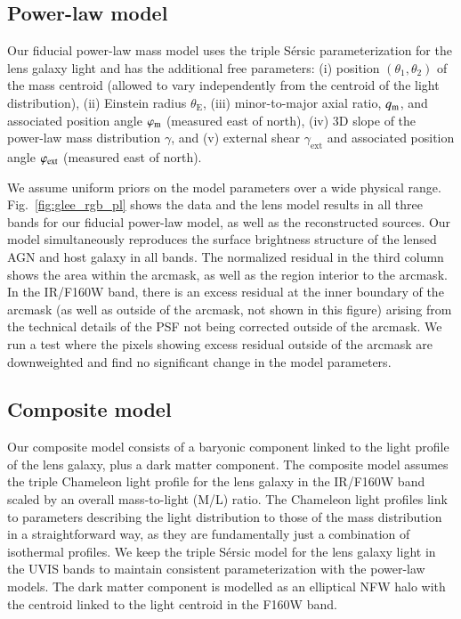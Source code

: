 \documentclass[longauth]{aa}
\newcommand{\ajsiii}[1]{{{#1}}}
\newcommand{\suyu}[1]{{{#1}}}
\newcommand{\lreply}[1]{{{#1}}}
\begin{document}
\subsection{Power-law model} \label{subsec:glee_pl_model}
Our fiducial power-law mass model uses the triple S\'{e}rsic parameterization for the lens galaxy light and has the additional free parameters: (i) position $(\theta_{1}, \theta_{2})$ of the mass centroid (allowed to vary independently from the centroid of the light distribution),
(ii) Einstein radius $\theta_{\mathrm{E}}$, (iii) minor-to-major axial ratio, \ajsiii{$q_{\rm m}$}, and associated position angle \ajsiii{${\varphi}_{\rm m}$} (measured east of north),
(iv) 3D slope of the power-law mass distribution $\gamma$, and (v) external shear $\gamma_{\mathrm{ext}}$ and associated position angle \ajsiii{$\varphi_{\rm ext}$} (measured east of north). %


We assume uniform priors on the model parameters over a wide physical range.  \lreply{Fig.}~\ref{fig:glee_rgb_pl} shows the data and the lens model results in all three bands for our fiducial power-law model, as well as the reconstructed sources.  Our model simultaneously reproduces the surface brightness structure of the lensed AGN and host galaxy in all bands.  The normalized residual in the third column shows the area within the arcmask, as well as the region interior to the arcmask.  In the IR/F160W band, there is an excess residual at the inner boundary of the arcmask (as well as outside of the arcmask, not shown in this figure) arising from the technical details of the PSF not being corrected outside of the arcmask.  We run a test where the pixels showing excess residual outside of the arcmask are downweighted and find no significant change in the model parameters.

\subsection{Composite model} \label{subsec:glee_comp_model}
Our composite model consists of a baryonic component linked to the light profile of the lens galaxy, plus a dark matter component.  The composite model assumes the triple Chameleon light profile for the lens galaxy in the IR/F160W band scaled by an overall mass-to-light (M/L) ratio.  The Chameleon light profiles link to parameters describing the light distribution to those of the mass distribution in a straightforward way, as they are fundamentally just a combination of isothermal profiles.  We keep the triple S\'{e}rsic model for the lens galaxy light in the UVIS bands to maintain consistent parameterization with the power-law models.  The dark matter component is modelled as an elliptical NFW \citep{Navarro96} halo with the centroid linked to the light centroid in the F160W band.
\end{document}
